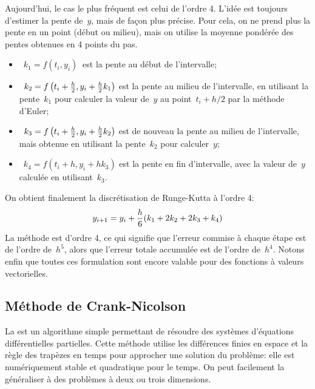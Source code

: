Aujourd'hui, le cas le plus fréquent est celui de l'ordre 4. L'idée est toujours d'estimer la pente de~$y$, mais de façon plus précise. Pour cela, on ne prend plus la pente en un point (début ou milieu), mais on utilise la moyenne pondérée des pentes obtenues en 4 points du pas. 
\begin{itemize} 
\item~$k_1 = f \left( t_i, y_i \right)~$ est la pente au début de l'intervalle; 
\item~$k_2 = f \left( t_i + {h \over 2}, y_i + {h\over 2} k_1 \right)$ est la pente au milieu de l'intervalle, en utilisant la pente~$k_1$ pour calculer la valeur de~$y$ au point~$t_i + h/2$ par la méthode d'Euler; 
\item~$k_3 = f \left( t_i + {h \over 2}, y_i + {h\over 2} k_2 \right)$ est de nouveau la pente au milieu de l'intervalle, mais obtenue en utilisant la pente~$k_2$ pour calculer~$y$; 
\item~$k_4 = f \left( t_i + h, y_i + h k_3\right)$ est la pente en fin d'intervalle, avec la valeur de~$y$ calculée en utilisant~$k_3$. 
\end{itemize} 
 On obtient finalement la discrétisation de Runge-Kutta à l'ordre 4:
\begin{equation}
y_{i+1} = y_i + {h \over 6} (k_1 + 2k_2 + 2k_3 + k_4)
\end{equation}
La méthode est d'ordre 4, ce qui signifie que l'erreur commise à chaque étape est de l'ordre de~$h^5$, alors que l'erreur totale accumulée est de l'ordre de~$h^4$. Notons enfin que toutes ces formulation sont encore valable pour des fonctions à valeurs vectorielles. 

\medskip
\subsection{Méthode de Crank-Nicolson}

La  est un algorithme simple permettant de résoudre des systèmes d'équations différentielles partielles. 
Cette méthode utilise les différences finies en espace et la règle des trapèzes en temps pour approcher une solution du problème: 
elle est numériquement stable et quadratique pour le temps. 
On peut facilement la généraliser à des problèmes à deux ou trois dimensions.

